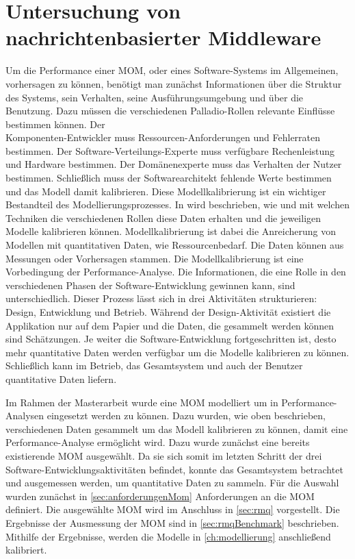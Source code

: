 

\chapter{Untersuchung von nachrichtenbasierter Middleware}
\label{ch:mom}
Um die Performance einer MOM, oder eines Software-Systems im Allgemeinen, vorhersagen zu können, benötigt man zunächst Informationen über die Struktur des Systems, sein Verhalten, seine Ausführungsumgebung und über die Benutzung. Dazu müssen die verschiedenen Palladio-Rollen relevante Einflüsse bestimmen können. Der \\ Komponenten-Entwickler muss Ressourcen-Anforderungen und Fehlerraten bestimmen. Der Software-Verteilungs-Experte muss verfügbare Rechenleistung und Hardware bestimmen. Der Domänenexperte muss das Verhalten der Nutzer bestimmen. Schließlich muss der Softwarearchitekt fehlende Werte bestimmen und das Modell damit kalibrieren. Diese Modellkalibrierung ist ein wichtiger Bestandteil des Modellierungsprozesses. In \cite{palladio17} wird beschrieben, wie und mit welchen Techniken die verschiedenen Rollen diese Daten erhalten und die jeweiligen Modelle kalibrieren können. Modellkalibrierung ist dabei die Anreicherung von Modellen mit quantitativen Daten, wie Ressourcenbedarf. Die Daten können aus Messungen oder Vorhersagen stammen. Die Modellkalibrierung ist eine Vorbedingung der Performance-Analyse. Die Informationen, die eine Rolle in den verschiedenen Phasen der Software-Entwicklung gewinnen kann, sind unterschiedlich. Dieser Prozess lässt sich in drei Aktivitäten strukturieren: Design, Entwicklung und Betrieb. Während der Design-Aktivität existiert die Applikation nur auf dem Papier und die Daten, die gesammelt werden können sind Schätzungen. Je weiter die Software-Entwicklung fortgeschritten ist, desto mehr quantitative Daten werden verfügbar um die Modelle kalibrieren zu können. Schließlich kann im Betrieb, das Gesamtsystem und auch der Benutzer quantitative Daten liefern. 

Im Rahmen der Masterarbeit wurde eine MOM modelliert um in Performance-Ana\-ly\-sen eingesetzt werden zu können. Dazu wurden, wie oben beschrieben, verschiedenen Daten gesammelt um das Modell kalibrieren zu können, damit eine Performance-Analyse ermöglicht wird. Dazu wurde zunächst eine bereits existierende MOM ausgewählt. Da sie sich somit im letzten Schritt der drei Software-Entwicklungsaktivitäten befindet, konnte das Gesamtsystem betrachtet und ausgemessen werden, um quantitative Daten zu sammeln. Für die Auswahl wurden zunächst in \autoref{sec:anforderungenMom} Anforderungen an die MOM definiert. Die ausgewählte MOM wird im Anschluss in \autoref{sec:rmq} vorgestellt. Die Ergebnisse der Ausmessung der MOM sind in \autoref{sec:rmqBenchmark} beschrieben. Mithilfe der Ergebnisse, werden die Modelle in \autoref{ch:modellierung} anschließend kalibriert.



